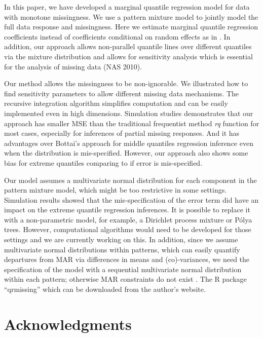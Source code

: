 \documentclass[useAMS,usenatbib,referee]{biom}
\newcommand{\polya}{P\'{o}lya} \newcommand{\yobs}{\bmath y_{\itl{obs}}}
\begin{document}
In this paper, we have developed a marginal quantile regression model
for data with monotone missingness. We use a pattern mixture model to
jointly model the full data response and missingness. Here we estimate
marginal quantile regression coefficients instead of coefficients
conditional on random effects as in \citet{yuan2010}. In addition, our
approach allows non-parallel quantile lines over different quantiles
via the mixture distribution and allows for sensitivity analysis which
is essential for the analysis of missing data (NAS 2010).

Our method allows the missingness to be non-ignorable.
We illustrated how to find sensitivity parameters to allow different missing data mechanisms. The
recursive integration algorithm simplifies computation and can be
easily implemented even in high dimensions. Simulation studies
demonstrates that our approach has smaller MSE than the traditional
frequentist method \textit{rq} function for most cases, especially for
inferences of partial missing responses. And it has advantages over
Bottai's approach for middle quantiles regression inference even when
the distribution is mis-specified.  However, our approach also shows
some bias for extreme quantiles comparing to \citet{bottai2013} if
error is mis-specified.

Our model assumes a multivariate normal distribution for each
component in the pattern mixture model, which might be too restrictive
in some settings. Simulation results showed that the mis-specification
of the error term did have an impact on the extreme quantile
regression inferences.  It is possible to replace it with a
non-parametric model, for example, a Dirichlet process mixture or
\polya{} trees. However, computational algorithms would need to be
developed for those settings and we are currently working on this. In addition, since we assume
multivariate normal distributions within patterns, which can easily
quantify departures from MAR via differences in means and
(co)-variances, we need the specification of the model with a sequential
multivariate normal distribution within each pattern; otherwise MAR
constraints do not exist \citep{wang2011}.
The R package ``qrmissing'' which can be downloaded from the author's website.

\backmatter


\section*{Acknowledgments}
\end{document}

